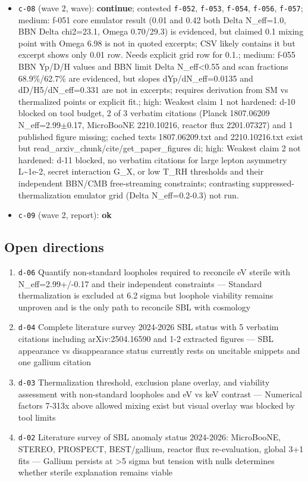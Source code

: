 \documentclass[11pt,a4paper]{article}
\begin{document}
\begin{itemize}
  \item \texttt{c-08} (wave 2, wave): \textbf{continue}; contested \texttt{f-052}, \texttt{f-053}, \texttt{f-054}, \texttt{f-056}, \texttt{f-057}; medium: f-051 core emulator result (0.01 and 0.42 both Delta N\_eff=1.0, BBN Delta chi2=23.1, Omega 0.70/29.3) is evidenced, but claimed 0.1 mixing point with Omega 6.98 is not in quoted excerpts; CSV likely contains it but excerpt shows only 0.01 row. Needs explicit grid row for 0.1.; medium: f-055 BBN Yp/D/H values and BBN limit Delta N\_eff\textless{}0.55 and scan fractions 68.9\%/62.7\% are evidenced, but slopes dYp/dN\_eff=0.0135 and dD/H5/dN\_eff=0.331 are not in excerpts; requires derivation from SM vs thermalized points or explicit fit.; high: Weakest claim 1 not hardened: d-10 blocked on tool budget, 2 of 3 verbatim citations (Planck 1807.06209 N\_eff=2.99$\pm$0.17, MicroBooNE 2210.10216, reactor flux 2201.07327) and 1 published figure missing; cached texts 1807.06209.txt and 2210.10216.txt exist but read\_arxiv\_chunk/cite/get\_paper\_figures di; high: Weakest claim 2 not hardened: d-11 blocked, no verbatim citations for large lepton asymmetry L\textasciitilde{}1e-2, secret interaction G\_X, or low T\_RH thresholds and their independent BBN/CMB free-streaming constraints; contrasting suppressed-thermalization emulator grid (Delta N\_eff=0.2-0.3) not run.
  \item \texttt{c-09} (wave 2, report): \textbf{ok}
\end{itemize}
\subsection{Open directions}
\begin{enumerate}
  \item \texttt{d-06} Quantify non-standard loopholes required to reconcile eV sterile with N\_eff=2.99+/-0.17 and their independent constraints --- Standard thermalization is excluded at 6.2 sigma but loophole viability remains unproven and is the only path to reconcile SBL with cosmology
  \item \texttt{d-04} Complete literature survey 2024-2026 SBL status with 5 verbatim citations including arXiv:2504.16590 and 1-2 extracted figures --- SBL appearance vs disappearance status currently rests on uncitable snippets and one gallium citation
  \item \texttt{d-03} Thermalization threshold, exclusion plane overlay, and viability assessment with non-standard loopholes and eV vs keV contrast --- Numerical factors 7-313x above allowed mixing exist but visual overlay was blocked by tool limits
  \item \texttt{d-02} Literature survey of SBL anomaly status 2024-2026: MicroBooNE, STEREO, PROSPECT, BEST/gallium, reactor flux re-evaluation, global 3+1 fits --- Gallium persists at \textgreater{}5 sigma but tension with nulls determines whether sterile explanation remains viable
\end{enumerate}
\end{document}
